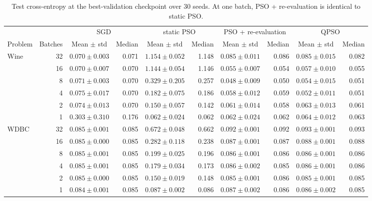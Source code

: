 \begin{table}[t]
\centering
\caption{Test cross-entropy at the best-validation checkpoint over 30 seeds. At one batch, PSO + re-evaluation is identical to static PSO.}
\label{tab:test_ce}
\begin{tabular}{lrcrcrcrcr}
\toprule
 & & \multicolumn{2}{c}{SGD} & \multicolumn{2}{c}{static PSO} & \multicolumn{2}{c}{PSO + re-evaluation} & \multicolumn{2}{c}{QPSO} \\
\cmidrule(lr){3-4} \cmidrule(lr){5-6} \cmidrule(lr){7-8} \cmidrule(lr){9-10}
Problem & Batches & Mean $\pm$ std & Median & Mean $\pm$ std & Median & Mean $\pm$ std & Median & Mean $\pm$ std & Median \\
\midrule
Wine & 32 & $0.070 \pm 0.003$ & 0.071 & $1.154 \pm 0.052$ & 1.148 & $0.085 \pm 0.011$ & 0.086 & $0.085 \pm 0.015$ & 0.082 \\
 & 16 & $0.070 \pm 0.007$ & 0.070 & $1.144 \pm 0.054$ & 1.146 & $0.055 \pm 0.007$ & 0.054 & $0.057 \pm 0.010$ & 0.055 \\
 & 8 & $0.071 \pm 0.003$ & 0.070 & $0.329 \pm 0.205$ & 0.257 & $0.048 \pm 0.009$ & 0.050 & $0.054 \pm 0.015$ & 0.051 \\
 & 4 & $0.075 \pm 0.017$ & 0.070 & $0.182 \pm 0.075$ & 0.186 & $0.058 \pm 0.012$ & 0.059 & $0.052 \pm 0.011$ & 0.051 \\
 & 2 & $0.074 \pm 0.013$ & 0.070 & $0.150 \pm 0.057$ & 0.142 & $0.061 \pm 0.014$ & 0.058 & $0.063 \pm 0.013$ & 0.061 \\
 & 1 & $0.303 \pm 0.310$ & 0.176 & $0.062 \pm 0.024$ & 0.062 & $0.062 \pm 0.024$ & 0.062 & $0.064 \pm 0.012$ & 0.063 \\
\midrule
WDBC & 32 & $0.085 \pm 0.001$ & 0.085 & $0.672 \pm 0.048$ & 0.662 & $0.092 \pm 0.001$ & 0.092 & $0.093 \pm 0.001$ & 0.093 \\
 & 16 & $0.085 \pm 0.000$ & 0.085 & $0.282 \pm 0.118$ & 0.238 & $0.087 \pm 0.001$ & 0.087 & $0.088 \pm 0.001$ & 0.088 \\
 & 8 & $0.085 \pm 0.001$ & 0.085 & $0.199 \pm 0.025$ & 0.196 & $0.086 \pm 0.001$ & 0.086 & $0.086 \pm 0.001$ & 0.086 \\
 & 4 & $0.085 \pm 0.001$ & 0.085 & $0.179 \pm 0.034$ & 0.173 & $0.086 \pm 0.002$ & 0.085 & $0.086 \pm 0.001$ & 0.086 \\
 & 2 & $0.085 \pm 0.000$ & 0.085 & $0.150 \pm 0.019$ & 0.148 & $0.085 \pm 0.001$ & 0.086 & $0.085 \pm 0.001$ & 0.085 \\
 & 1 & $0.084 \pm 0.001$ & 0.085 & $0.087 \pm 0.002$ & 0.086 & $0.087 \pm 0.002$ & 0.086 & $0.086 \pm 0.002$ & 0.085 \\

\end{tabular}
\end{table}
